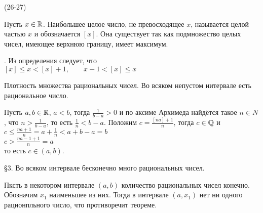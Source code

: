 (26-27)

\Op Пусть $x \in \mathbb{R}$. Наибольшее целое число, не превосходящее $x$, называется целой частью $x$ и обозначается $[x]$. Она существует так как подмножество целых чисел, имеющее верхнюю границу, имеет максимум.

. Из определения следует, что\\
$[x] \le x < [x] + 1, \qquad x - 1 < [x] \le x$

\T \q Плотность множества рациональных чисел. Во всяком непустом иитервале есть рациональное число.

\D Пусть $a, b\in \mathbb{R}$, $a < b$, тогда $\frac{1}{b - a} > 0$ и по аксиме Архимеда найдётся такое $n\in N$, что $n > \frac{1}{b - a}$, то есть $\frac{1}{n} < b - a$. Положим $c = \frac{[na] + 1}{n}$, тогда $c \in \mathbb{Q}$ и\\
$c \le \frac{na + 1}{n} = a + \frac{1}{n} < a + b - a = b$\\
$c > \frac{na - 1 + 1}{n} = a$\\
то есть $c \in (a, b)$.

\S3. Во всяком интервале бесконечно много рациональных чисел.

\D Пксть в некотором интервале $(a, b)$ количество рациональных чисел конечно. Обозначим $x_1$ наименьшее из них. Тогда в интервале $(a, x_1)$ нет ни одного рационпльного число, что противоречит теореме.